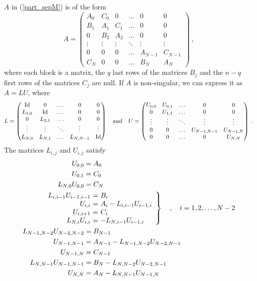 $A$ in (\ref{part_sepM}) is of the form
\[
A = \begin{pmatrix}
A_0 & C_0 & 0 & \ldots & 0 & 0 \\
B_1 & A_1 & C_1 & \ldots & 0 & 0 \\
0 & B_2 & A_2 &  \ldots & 0 & 0 \\
\vdots & \vdots & \vdots & \ddots & \vdots & \vdots  \\
0 & 0 & 0 & \ldots & A_{N-1} & C_{N-1} \\
C_N & 0 & 0 & \ldots & B_N & A_N
\end{pmatrix} \ ,
\]
where each block is a \nn matrix, the $q$ last rows of the \nn
matrices $B_j$ and the $n-q$ first rows of the \nn matrices
$C_j$ are null.  If $A$ is non-singular, we can express it as $A = L
U$, where
\[
L = \begin{pmatrix}
\operatorname{Id} & 0 & \ldots & 0 & 0\\
L_{1,0} & \operatorname{Id} & \ldots & 0 & 0\\
0 & L_{2,1} &\ldots & 0 & 0\\
\vdots & \vdots & \ddots & \vdots & \vdots \\
L_{N,0} & L_{N,1} & \ldots & L_{N,N-1} & \operatorname{Id}
\end{pmatrix}
\quad \text{and} \quad
U = \begin{pmatrix}
U_{0,0} & U_{0,1} & \ldots & 0 & 0 \\
0 & U_{1,1} & \ldots & 0 & 0 \\
\vdots & \vdots & \ddots & \vdots & \vdots \\
0 & 0 & \ldots & U_{N-1,N-1} & U_{N-1,N} \\
0 & 0 & \ldots & 0 & U_{N,N}
\end{pmatrix} \ .
\]
The \nn matrices $L_{i,j}$ and $U_{i,j}$ satisfy
\begin{align*}
U_{0,0} &= A_0 \\
U_{0,1} &= C_0 \\
L_{N,0} U_{0,0} & = C_N \\
&\hspace{-6em} \left.
\begin{array}{r@{\ = \ }l}
  L_{i,i-1} U_{i-1,i-1} & B_i \\
  U_{i,i} & A_i - L_{i,i-1} U_{i-1,i} \\
  U_{i,i+1} & C_i \\
  L_{N,i} U_{i,i} & - L_{N,i-1}U_{i-1,i}
\end{array}
\right\} \quad , \quad i = 1, 2, \ldots, N-2 \\                    
L_{N-1,N-2} U_{N-2,N-2} &= B_{N-1} \\
U_{N-1,N-1} &= A_{N-1} - L_{N-1,N-2} U_{N-2,N-1} \\
U_{N-1,N} &= C_{N-1} \\
L_{N,N-1} U_{N-1,N-1} &= B_N - L_{N,N-2} U_{N-2,N-1} \\
U_{N,N} &= A_N - L_{N,N-1} U_{N-1,N}
\end{align*}

